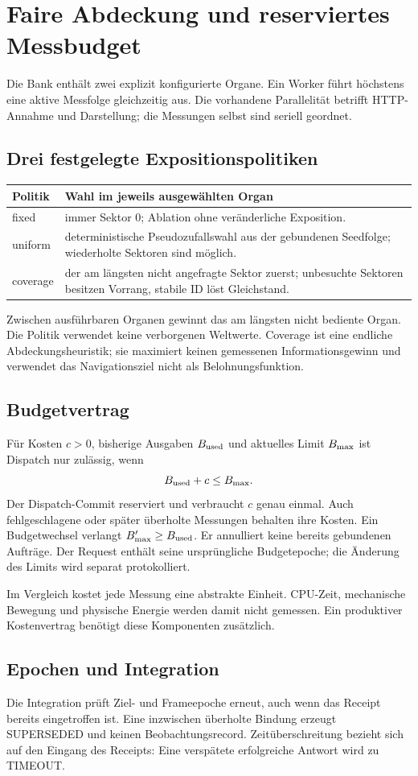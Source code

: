 \documentclass[11pt,a4paper]{article}
\newcommand{\nextsection}[2]{\clearpage{\color{accent}\small\textsf{#1}}\section{#2}}
\begin{document}
\nextsection{24 / ORGANBANK}{Faire Abdeckung und reserviertes Messbudget}
Die Bank enthält zwei explizit konfigurierte Organe. Ein Worker
führt höchstens eine aktive Messfolge gleichzeitig aus.
Die vorhandene Parallelität betrifft HTTP-Annahme und
Darstellung; die Messungen selbst sind seriell geordnet.

\subsection{Drei festgelegte Expositionspolitiken}
\begin{tabularx}{\linewidth}{@{}lY@{}}
\toprule
Politik & Wahl im jeweils ausgewählten Organ\\\midrule
fixed & immer Sektor 0; Ablation ohne veränderliche Exposition.\\
uniform & deterministische Pseudozufallswahl aus der gebundenen
Seedfolge; wiederholte Sektoren sind möglich.\\
coverage & der am längsten nicht angefragte Sektor zuerst;
unbesuchte Sektoren besitzen Vorrang, stabile ID löst Gleichstand.\\
\bottomrule
\end{tabularx}
Zwischen ausführbaren Organen gewinnt das am längsten nicht
bediente Organ. Die Politik verwendet keine verborgenen
Weltwerte. Coverage ist eine endliche Abdeckungsheuristik;
sie maximiert keinen gemessenen Informationsgewinn und
verwendet das Navigationsziel nicht als Belohnungsfunktion.

\subsection{Budgetvertrag}
Für Kosten $c>0$, bisherige Ausgaben $B_{\rm used}$ und
aktuelles Limit $B_{\rm max}$ ist Dispatch nur zulässig, wenn
\[
B_{\rm used}+c\leq B_{\rm max}.
\]
Der Dispatch-Commit reserviert und verbraucht $c$ genau einmal.
Auch fehlgeschlagene oder später überholte Messungen behalten
ihre Kosten. Ein Budgetwechsel verlangt
$B'_{\rm max}\geq B_{\rm used}$. Er annulliert keine bereits
gebundenen Aufträge. Der Request enthält seine ursprüngliche
Budgetepoche; die Änderung des Limits wird separat protokolliert.

Im Vergleich kostet jede Messung eine abstrakte Einheit.
CPU-Zeit, mechanische Bewegung und physische Energie werden
damit nicht gemessen. Ein produktiver Kostenvertrag benötigt
diese Komponenten zusätzlich.

\subsection{Epochen und Integration}
Die Integration prüft Ziel- und Frameepoche erneut, auch wenn
das Receipt bereits eingetroffen ist. Eine inzwischen überholte
Bindung erzeugt SUPERSEDED und keinen Beobachtungsrecord.
Zeitüberschreitung bezieht sich auf den Eingang des Receipts:
Eine verspätete erfolgreiche Antwort wird zu TIMEOUT.
\end{document}
